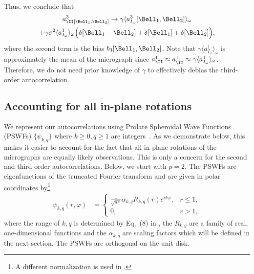 \documentclass[9pt,twocolumn,twoside,lineno]{pnas-new}
\begin{document}
Thus, we conclude that
\begin{multline} \label{eq:third_order_ac_micro_volume}
a^3_\II[\Bell_1, \Bell_2] \to \gamma\langle
a^3_{I_{\omega}}[\Bell_1, \Bell_2]\rangle_{\omega} \\ +
\gamma\sigma^2\langle a^1_{I_{\omega}}\rangle_{\omega}\Big(\delta[\Bell_1 - \Bell_2] +
\delta[\Bell_1] + \delta[\Bell_2]\Big),
\end{multline}
where the second term is the bias $b_3[\Bell_1,\Bell_2]$.
Note that $\gamma\langle a^1_{I_{\omega}}\rangle_{\omega}$ is approximately the mean of the micrograph since  $a^1_\II \approx a^1_{\tilde\II} \approx \gamma\langle a^1_{I_{\omega}}\rangle_{\omega}$. Therefore, we do not need prior knowledge of $\gamma$ to effectively
debias the third-order autocorrelation.

\subsection{Accounting for all in-plane rotations} \label{sec:steering}

We represent our autocorrelations using Prolate Spheroidal Wave Functions (PSWFs) $\{\psi_{k,q}\}$ where $k \geq 0, q \geq 1$ are integers~\cite{slepian1964pswfIV}. As we demonstrate below, this makes it easier to account for the fact that all in-plane rotations of the micrographs are equally likely observations. This is only a concern for the second and third order autocorrelations. Below, we start with $p=2$.
The PSWFs are eigenfunctions of the truncated Fourier transform and are given in polar coordinates by\footnote{A different normalization is used in \cite{landa2017steerable}.}
\begin{align}
\psi_{k,q}(r,\varphi) & = \left\{\begin{array}{ll} \frac{1}{\sqrt{8\pi}}\alpha_{k,q}R_{k,q}(r)e^{\iota k\varphi}, & r\leq 1,\\ 0, & r>1,\end{array}\right. \label{eq:prolatesdef}
\end{align}
where the range of $k,q$ is determined by Eq.~(8) in \cite{landa2017steerable}, the ${R_{k,q}}$ are a family of real, one-dimensional functions and the ${\alpha_{k,q}}$ are  scaling factors which will be defined in the next section.
The PSWFs are orthogonal on the unit disk.
\end{document}
